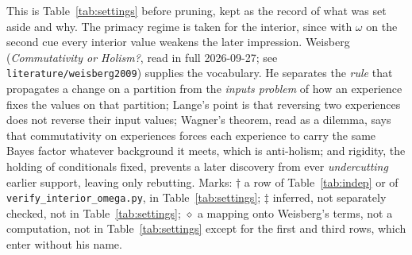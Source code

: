 \documentclass[11pt,a4paper]{article}
\begin{document}
\noindent This is Table~\ref{tab:settings} before pruning, kept as the record
of what was set aside and why. The primacy regime is taken for the interior,
since with $\omega$ on the second cue every interior value weakens the later
impression. Weisberg (\emph{Commutativity or Holism?}, read in full
2026-09-27; see \texttt{literature/weisberg2009}) supplies the vocabulary. He
separates the \emph{rule} that propagates a change on a partition from the
\emph{inputs problem} of how an experience fixes the values on that
partition; Lange's point is that reversing two experiences does not reverse
their input values; Wagner's theorem, read as a dilemma, says that
commutativity on experiences forces each experience to carry the same Bayes
factor whatever background it meets, which is anti-holism; and rigidity, the
holding of conditionals fixed, prevents a later discovery from ever
\emph{undercutting} earlier support, leaving only rebutting. Marks: $\dagger$
a row of Table~\ref{tab:indep} or of \texttt{verify\_interior\_omega.py},
in Table~\ref{tab:settings}; $\ddagger$ inferred, not separately checked, not
in Table~\ref{tab:settings}; $\diamond$ a mapping onto Weisberg's terms, not
a computation, not in Table~\ref{tab:settings} except for the first and
third rows, which enter without his name.
\end{document}
